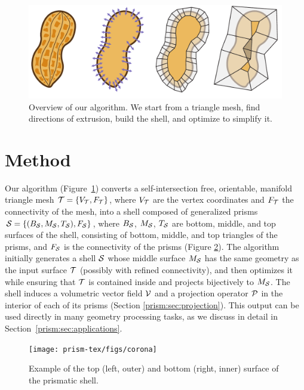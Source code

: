 \begin{figure}
    \centering
    \includegraphics[width=\linewidth]{prism-tex/figs/pipeline}
    \caption{Overview of our algorithm. We start from a triangle mesh, find directions of extrusion, build the shell, and optimize to simplify it.}
    \label{prism:fig:pipeline}
    
\end{figure}

\section{Method}\label{prism:sec:method}
Our algorithm (Figure~\ref{prism:fig:pipeline}) converts a self-intersection free, orientable, manifold triangle mesh $\T = \{V_\T,F_\T\}$, where $V_\T$ are the vertex coordinates and
$F_\T$ the connectivity of the mesh, into a shell composed of generalized prisms $\S = \{(B_\S,M_\S,T_\S),F_\S\}$, where $B_\S$, $M_\S$, $T_\S$ are bottom, middle, and top surfaces of the shell, 
consisting of bottom, middle, and top  triangles of the prisms,
and $F_\S$  is the connectivity of the prisms (Figure \ref{prism:fig:corona}).
The algorithm initially generates a shell $\S$ whose middle surface $M_\S$ has the same geometry as the input surface $\T$ (possibly with refined connectivity),
and then optimizes it while ensuring that $\T$ is contained inside and projects bijectively to $M_\S$. The shell induces a volumetric vector field $\V$ and a projection operator $\P$ in the interior of each of its prisms (Section \ref{prism:sec:projection}). This output can be used directly in many geometry processing tasks, as we discuss in detail in Section~\ref{prism:sec:applications}.

\begin{figure}
    \centering
    \texttt{[image: prism-tex/figs/corona]}
    \caption{Example of the top (left, outer) and bottom (right, inner) surface of the prismatic shell.}
    
    \label{prism:fig:corona}
\end{figure}


